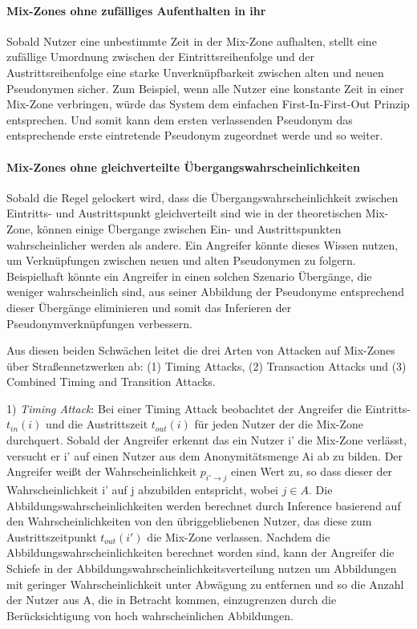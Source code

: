 \paragraph{Mix-Zones ohne zufälliges Aufenthalten in ihr} Sobald Nutzer eine unbestimmte Zeit in der Mix-Zone aufhalten, stellt eine zufällige Umordnung zwischen der Eintrittsreihenfolge und der Austrittsreihenfolge eine starke Unverknüpfbarkeit zwischen alten und neuen Pseudonymen sicher. Zum Beispiel, wenn alle Nutzer eine konstante Zeit in einer Mix-Zone verbringen, würde das System dem einfachen First-In-First-Out Prinzip entsprechen. Und somit kann dem ersten verlassenden Pseudonym das entsprechende erste eintretende Pseudonym zugeordnet werde und so weiter.

\paragraph{Mix-Zones ohne gleichverteilte Übergangswahrscheinlichkeiten} Sobald die Regel gelockert wird, dass die Übergangswahrscheinlichkeit zwischen Eintritts- und Austrittspunkt gleichverteilt sind wie in der theoretischen Mix-Zone, können einige Übergange zwischen Ein- und Austrittspunkten wahrscheinlicher werden als andere. Ein Angreifer könnte dieses Wissen nutzen, um  Verknüpfungen zwischen neuen und alten Pseudonymen zu folgern. Beispielhaft könnte ein Angreifer in einen solchen Szenario Übergänge, die weniger wahrscheinlich sind, aus seiner Abbildung der Pseudonyme entsprechend dieser Übergänge eliminieren und somit das Inferieren der Pseudonymverknüpfungen verbessern.

Aus diesen beiden Schwächen leitet \cite{Palanisamy2015} die drei Arten von Attacken auf Mix-Zones über Straßennetzwerken ab: (1) Timing Attacks, (2) Transaction Attacks und (3) Combined  Timing and Transition Attacks.

1)	\textit{Timing Attack}: Bei einer Timing Attack beobachtet der Angreifer die Eintritts- $t_{in}(i)$ und die Austrittszeit $t_{out}(i)$ für jeden Nutzer der die Mix-Zone durchquert. Sobald der Angreifer erkennt das ein Nutzer i' die Mix-Zone verlässt, versucht er i' auf einen Nutzer aus dem Anonymitätsmenge Ai ab zu bilden. Der Angreifer weißt der Wahrscheinlichkeit $p_{i'\rightarrow j}$ einen Wert zu, so dass dieser der Wahrscheinlichkeit i' auf j abzubilden entspricht, wobei $j \in A$. Die Abbildungswahrscheinlichkeiten werden berechnet durch Inference basierend auf den Wahrscheinlichkeiten von den übriggebliebenen Nutzer, das diese zum Austrittszeitpunkt $t_{out}(i')$ die Mix-Zone verlassen.  Nachdem die Abbildungswahrscheinlichkeiten berechnet worden sind, kann der Angreifer die Schiefe in der Abbildungswahrscheinlichkeitsverteilung nutzen um Abbildungen mit geringer Wahrscheinlichkeit  unter Abwägung zu entfernen und so die Anzahl der Nutzer aus A, die in Betracht kommen, einzugrenzen durch die Berücksichtigung von hoch wahrscheinlichen  Abbildungen.

